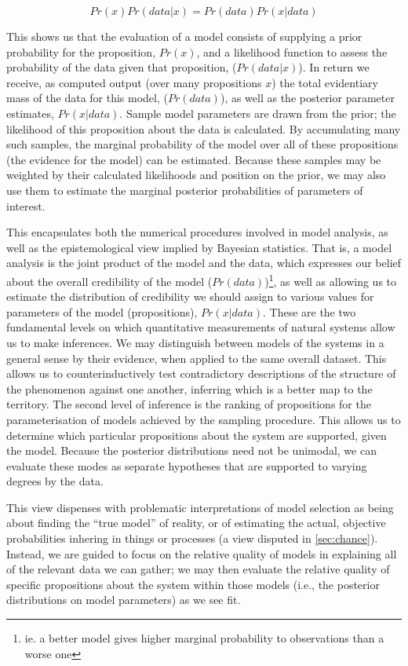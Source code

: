 \[Pr(x)Pr(data|x) = Pr(data)Pr(x|data)\]

This shows us that the evaluation of a model consists of supplying a prior probability for the proposition, $Pr(x)$, and a likelihood function to assess the probability of the data given that proposition, ($Pr(data|x)$). In return we receive, as computed output (over many propositions $x$) the total evidentiary mass of the data for this model, ($Pr(data)$), as well as the posterior parameter estimates, $Pr(x|data)$. Sample model parameters are drawn from the prior; the likelihood of this proposition about the data is calculated. By accumulating many such samples, the marginal probability of the model over all of these propositions (the evidence for the model) can be estimated. Because these samples may be weighted by their calculated likelihoods and position on the prior, we may also use them to estimate the marginal posterior probabilities of parameters of interest. 

This encapsulates both the numerical procedures involved in model analysis, as well as the epistemological view implied by Bayesian statistics. That is, a model analysis is the joint product of the model and the data, which expresses our belief about the overall credibility of the model ($Pr(data)$)\footnote{ie. a better model gives higher marginal probability to observations than a worse one}, as well as allowing us to estimate the distribution of credibility we should assign to various values for parameters of the model (propositions), $Pr(x|data)$. These are the two fundamental levels on which quantitative measurements of natural systems allow us to make inferences. We may distinguish between models of the systems in a general sense by their evidence, when applied to the same overall dataset. This allows us to counterinductively test contradictory descriptions of the structure of the phenomenon against one another, inferring which is a better map to the territory. The second level of inference is the ranking of propositions for the parameterisation of models achieved by the sampling procedure. This allows us to determine which particular propositions about the system are supported, given the model. Because the posterior distributions need not be unimodal, we can evaluate these modes as separate hypotheses that are supported to varying degrees by the data. 

This view dispenses with problematic interpretations of model selection as being about finding the ``true model'' of reality, or of estimating the actual, objective probabilities inhering in things or processes (a view disputed in \autoref{sec:chance}). Instead, we are guided to focus on the relative quality of models in explaining all of the relevant data we can gather; we may then evaluate the relative quality of specific propositions about the system within those models (i.e., the posterior distributions on model parameters) as we see fit.  

